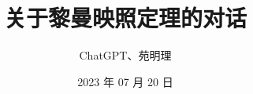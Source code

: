 \documentclass[
    fontsize=24pt, %
	twoside=false, %
	secnumdepth=0, %
    paper=b5paper, %
]{kaobook}
\begin{document}

\titlehead{暑期探索项目}
\title[Template for the {\normalfont\texttt{kaobook}} Class]{关于黎曼映照定理的对话}
\author{ChatGPT、苑明理}
\date{2023 年 07 月 20 日}
\publishers{暑期探索项目}


% 

\frontmatter %


\dedication{
	想象力是灵魂的眼睛。 \flushright —— 约瑟夫 · 朱伯特
}


\maketitle



\end{document}

